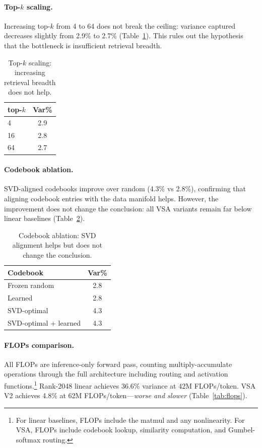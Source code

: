 \documentclass{article}
\begin{document}
\paragraph{Top-$k$ scaling.}
Increasing top-$k$ from 4 to 64 does not break the ceiling: variance captured decreases slightly from 2.9\% to 2.7\% (Table~\ref{tab:topk}).
This rules out the hypothesis that the bottleneck is insufficient retrieval breadth.

\begin{table}[h]
\centering
\caption{Top-$k$ scaling: increasing retrieval breadth does not help.}
\label{tab:topk}
\begin{tabular}{lc}
\toprule
top-$k$ & Var\% \\
\midrule
4 & 2.9 \\
16 & 2.8 \\
64 & 2.7 \\
\bottomrule
\end{tabular}
\end{table}

\paragraph{Codebook ablation.}
SVD-aligned codebooks improve over random (4.3\% vs 2.8\%), confirming that aligning codebook entries with the data manifold helps.
However, the improvement does not change the conclusion: all VSA variants remain far below linear baselines (Table~\ref{tab:codebook}).

\begin{table}[h]
\centering
\caption{Codebook ablation: SVD alignment helps but does not change the conclusion.}
\label{tab:codebook}
\begin{tabular}{lc}
\toprule
Codebook & Var\% \\
\midrule
Frozen random & 2.8 \\
Learned & 2.8 \\
SVD-optimal & 4.3 \\
SVD-optimal + learned & 4.3 \\
\bottomrule
\end{tabular}
\end{table}

\paragraph{FLOPs comparison.}
All FLOPs are inference-only forward pass, counting multiply-accumulate operations through the full architecture including routing and activation functions.\footnote{For linear baselines, FLOPs include the matmul and any nonlinearity. For VSA, FLOPs include codebook lookup, similarity computation, and Gumbel-softmax routing.}
Rank-2048 linear achieves 36.6\% variance at 42M FLOPs/token.
VSA V2 achieves 4.8\% at 62M FLOPs/token---\emph{worse and slower} (Table~\ref{tab:flops}).
\end{document}
